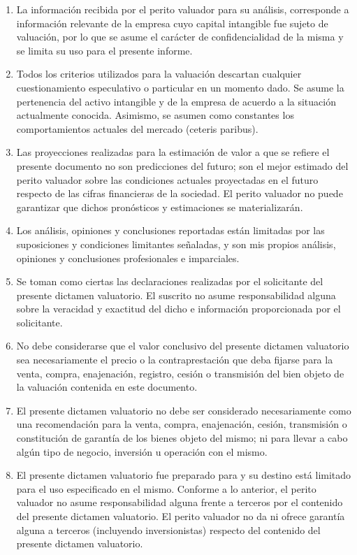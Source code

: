 \begin{enumerate}[\indent a)]
\item La informaci\'on recibida por el perito valuador para su an\'alisis, corresponde a informaci\'on relevante de la empresa cuyo capital intangible fue sujeto de valuaci\'on, por lo que se asume el car\'acter de confidencialidad de la misma y se limita su uso para el presente informe.
\item Todos los criterios utilizados para la valuaci\'on descartan cualquier cuestionamiento especulativo o particular en un momento dado. Se asume la pertenencia del activo intangible y de la empresa de acuerdo a la situaci\'on actualmente conocida. Asimismo, se asumen como constantes los comportamientos actuales del mercado (ceteris paribus).
\item Las proyecciones realizadas para la estimaci\'on de valor a que se refiere el presente documento no son predicciones del futuro; son el mejor estimado del perito valuador sobre las condiciones actuales proyectadas en el futuro respecto de las cifras financieras de la sociedad. El perito valuador no puede garantizar que dichos pron\'osticos y estimaciones se materializar\'an.
\item Los an\'alisis, opiniones y conclusiones reportadas est\'an limitadas por las suposiciones y condiciones limitantes se\~naladas, y son mis propios an\'alisis, opiniones y conclusiones profesionales e imparciales.
\item Se toman como ciertas las declaraciones realizadas por el solicitante del presente dictamen valuatorio. El suscrito no asume responsabilidad alguna sobre la veracidad y exactitud del dicho e informaci\'on proporcionada por el solicitante.
\item No debe considerarse que el valor conclusivo del presente dictamen valuatorio sea necesariamente el precio o la contraprestaci\'on que deba fijarse para la venta, compra, enajenaci\'on, registro, cesi\'on o transmisi\'on del bien objeto de la valuaci\'on   contenida en este documento.
\item El presente dictamen valuatorio no debe ser considerado necesariamente como una recomendaci\'on para la venta, compra, enajenaci\'on, cesi\'on, transmisi\'on o constituci\'on de garant\'ia de los bienes objeto del mismo; ni para llevar a cabo alg\'un tipo de negocio, inversi\'on u operaci\'on con el mismo.
\item El presente dictamen valuatorio fue preparado para \textcolor{principal}{\empresaSolicitante}{} y su destino est\'a limitado para el uso especificado  en el mismo. Conforme a lo anterior, el perito valuador no asume responsabilidad alguna frente a terceros por el contenido del presente dictamen valuatorio. El perito valuador no da ni ofrece garant\'ia alguna a terceros (incluyendo inversionistas) respecto del contenido del presente dictamen valuatorio.

\end{enumerate}
